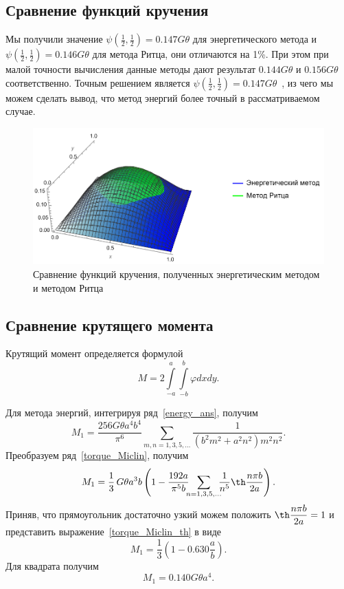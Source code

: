 \documentclass[12pt, a4paper]{article}
\begin{document}
\subsection{Сравнение функций кручения}
Мы получили	значение $\psi\left(\frac{1}{2}, \frac{1}{2}\right) = 0.147G\theta$ для энергетического метода и $\psi\left(\frac{1}{2}, \frac{1}{2}\right) = 0.146G\theta$ для метода Ритца, они отличаются на 1\%. При этом при малой точности вычисления данные методы дают результат $0.144G\theta$ и $0.156G\theta$ соответственно. Точным решением является $\psi\left(\frac{1}{2}, \frac{1}{2}\right) = 0.147G\theta$~\cite{Temochenko75}, из чего мы можем сделать вывод, что метод энергий более точный в рассматриваемом случае.
\begin{figure}[!h]
	\centering
	\includegraphics[width=1\textwidth]{compare3d}%
	\caption{
		Сравнение функций кручения, полученных энергетическим методом и методом Ритца
	}
	\vspace*{-2mm}
	\label{ritz_graph}
\end{figure}
\newpage
\subsection{Сравнение крутящего момента}
Крутящий момент определяется формулой
\begin{equation}
	\label{torque_com}
	M = 2 \int\limits_{-a}^a \int\limits_{-b}^b \varphi dx dy.
\end{equation}

Для метода энергий, интегрируя ряд~\eqref{energy_ans}, получим
\begin{equation}\label{torque_Miclin}
	M_1 = \frac{256 G \theta a^4 b^4} {\pi^6}\!\!\!\sum_{m, n = 1, 3, 5, \ldots}\!\!\!\frac{1}{(b^2 m^2 + a^2 n^2 )m^2 n^2}.
\end{equation}
Преобразуем ряд~\eqref{torque_Miclin}, получим
\begin{equation}\label{torque_Miclin_th}
M_1 = \frac{1}{3} \, G \theta a^3 b \left( 1 - \frac{192 a}{\pi^5 b}\!\!\!\sum_{n = 1, 3, 5, \ldots}\!\!\!\frac{1} {n^5} \th\dfrac{n \pi b} {2 a } \right).
\end{equation}
Приняв, что прямоугольник достаточно узкий можем положить $\th\dfrac{n \pi b} {2 a } = 1$  и представить  выражение~\eqref{torque_Miclin_th} в виде
\[
M_1=\frac{1}{3}\left(1 - 0.630\frac{a}{b}\right).
\]
Для квадрата получим
\[
M_1=0.140G\theta a^4.
\]
\end{document}
